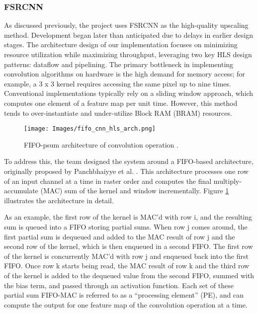 \documentclass{article}
\newcounter{subsubsubsection}[subsubsection]
\begin{document}
            
        \subsubsection{FSRCNN}
        \noindent As discussed previously, the project uses FSRCNN as the high-quality upscaling method. Development began later than anticipated due to delays in earlier design stages. The architecture design of our implementation focuses on minimizing resource utilization while maximizing throughput, leveraging two key HLS design patterns: dataflow and pipelining.
            \noindent The primary bottleneck in implementing convolution algorithms on hardware is the high demand for memory access; for example, a 3 x 3 kernel requires accessing the same pixel up to nine times. Conventional implementations typically rely on a sliding window approach, which computes one element of a feature map per unit time. However, this method tends to over-instantiate and under-utilize Block RAM (BRAM) resources.
            \begin{figure}[!tb] 
                \centering
                \texttt{[image: Images/fifo\_cnn\_hls\_arch.png]} 
                \caption{FIFO-psum architecture of convolution operation \cite{panchbhaiyye_efficient_2021}.} 
                \label{fig:fifo_arch} 
            \end{figure}
            \par To address this, the team designed the system around a FIFO-based architecture, originally proposed by Panchbhaiyye et al. \cite{panchbhaiyye_efficient_2021}. This architecture processes one row of an input channel at a time in raster order and computes the final multiply-accumulate (MAC) sum of the kernel and window incrementally. Figure \ref{fig:fifo_arch} illustrates the architecture in detail.
            \par As an example, the first row of the kernel is MAC’d with row i, and the resulting sum is queued into a FIFO storing partial sums. When row j comes around, the first partial sum is dequeued and added to the MAC result of row j and the second row of the kernel, which is then enqueued in a second FIFO. The first row of the kernel is concurrently MAC’d with row j and enqueued back into the first FIFO. Once row k starts being read, the MAC result of row k and the third row of the kernel is added to the dequeued value from the second FIFO, summed with the bias term, and passed through an activation function. Each set of these partial sum FIFO-MAC is referred to as a “processing element” (PE), and can compute the output for one feature map of the convolution operation at a time.
\end{document}
